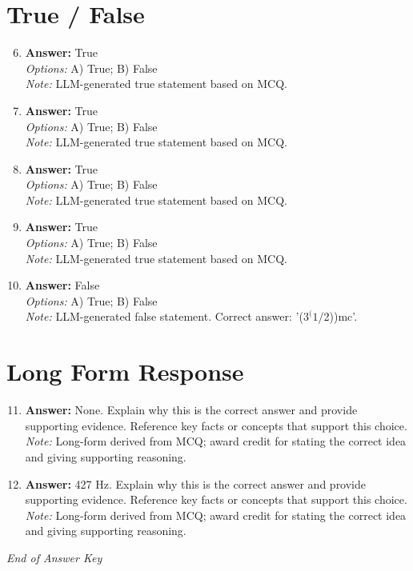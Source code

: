 \documentclass[12pt]{article}
\begin{document}
\section*{True / False}
\begin{enumerate}[label=\arabic*.]
\setcounter{enumi}{5}
\item \textbf{Answer:} True
\\ \textit{Options:} A) True; B) False
\\ \textit{Note:} LLM-generated true statement based on MCQ.
\item \textbf{Answer:} True
\\ \textit{Options:} A) True; B) False
\\ \textit{Note:} LLM-generated true statement based on MCQ.
\item \textbf{Answer:} True
\\ \textit{Options:} A) True; B) False
\\ \textit{Note:} LLM-generated true statement based on MCQ.
\item \textbf{Answer:} True
\\ \textit{Options:} A) True; B) False
\\ \textit{Note:} LLM-generated true statement based on MCQ.
\item \textbf{Answer:} False
\\ \textit{Options:} A) True; B) False
\\ \textit{Note:} LLM-generated false statement. Correct answer: '($3^(1$/2))mc'.
\end{enumerate}

\section*{Long Form Response}
\begin{enumerate}[label=\arabic*.]
\setcounter{enumi}{10}
\item \textbf{Answer:} None. Explain why this is the correct answer and provide supporting evidence. Reference key facts or concepts that support this choice.
\\ \textit{Note:} Long-form derived from MCQ; award credit for stating the correct idea and giving supporting reasoning.
\item \textbf{Answer:} 427 Hz. Explain why this is the correct answer and provide supporting evidence. Reference key facts or concepts that support this choice.
\\ \textit{Note:} Long-form derived from MCQ; award credit for stating the correct idea and giving supporting reasoning.
\end{enumerate}

\vfill
\noindent\textit{End of Answer Key}
\end{document}
